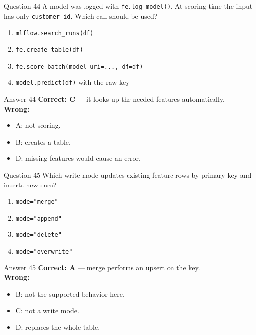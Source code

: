 \documentclass[aspectratio=169,11pt]{beamer}
\begin{document}
	\begin{frame}{Question 44}
		A model was logged with \texttt{fe.log\_model()}. At scoring time the input has only \texttt{customer\_id}. Which call should be used?
		\begin{enumerate}[label=\Alph*.]
			\item \texttt{mlflow.search\_runs(df)}
			\item \texttt{fe.create\_table(df)}
			\item \texttt{fe.score\_batch(model\_uri=..., df=df)}
			\item \texttt{model.predict(df)} with the raw key
		\end{enumerate}
	\end{frame}
	\begin{frame}{Answer 44}
		\textbf{Correct: C} --- it looks up the needed features automatically.\\
		\vspace{0.5em}
		\textbf{Wrong:}
		\begin{itemize}
			\item A: not scoring.
			\item B: creates a table.
			\item D: missing features would cause an error.
		\end{itemize}
	\end{frame}
	
	\begin{frame}{Question 45}
		Which write mode updates existing feature rows by primary key and inserts new ones?
		\begin{enumerate}[label=\Alph*.]
			\item \texttt{mode="merge"}
			\item \texttt{mode="append"}
			\item \texttt{mode="delete"}
			\item \texttt{mode="overwrite"}
		\end{enumerate}
	\end{frame}
	\begin{frame}{Answer 45}
		\textbf{Correct: A} --- merge performs an upsert on the key.\\
		\vspace{0.5em}
		\textbf{Wrong:}
		\begin{itemize}
			\item B: not the supported behavior here.
			\item C: not a write mode.
			\item D: replaces the whole table.
		\end{itemize}
	\end{frame}
	
\end{document}

